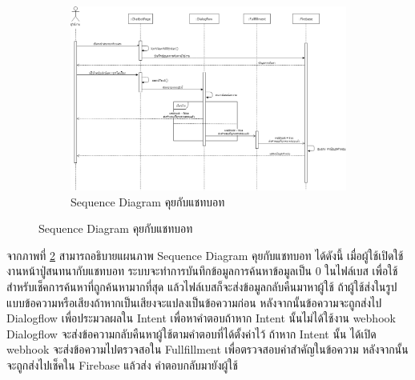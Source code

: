 	\begin{figure}
	\begin{figure}[H]
		\centering
		\includegraphics[width=0.8\columnwidth]
		{Figures/3/Sequence/chatbot}
		\caption{Sequence Diagram คุยกับแชทบอท}
		\label{Fig:Sequence-chatbot}
	\end{figure}
\end{figure}
	\newpage
	จากภาพที่ \ref{Fig:Sequence-chatbot} สามารถอธิบายแผนภาพ Sequence Diagram คุยกับแชทบอท ได้ดังนี้ 
	เมื่อผู้ใช้เปิดใช้งานหน้าปู่สนทนากับแชทบอท ระบบจะทำการบันทึกข้อมูลการค้นหาข้อมูลเป็น 0 ในไฟล์เบส เพื่อใช้สำหรับเช็คการค้นหาที่ถูกค้นหามากที่สุด
	แล้วไฟล์เบสก็จะส่งข้อมูลกลับคืนมาหาผู้ใช้ ถ้าผู้ใช้ส่งในรูปแบบข้อความหรือเสียงถ้าหากเป็นเสียงจะแปลงเป็นข้อความก่อน หลังจากนั้นข้อความจะถูกส่งไป Dialogflow 
	เพื่อประมวลผลใน Intent เพื่อหาคำตอบถ้าหาก Intent นั้นไม่ได้ใช้งาน webhook Dialogflow จะส่งข้อความกลับคืนหาผู้ใช้ตามคำตอบที่ได้ตั้งค่าไว้ ถ้าหาก Intent นั้น
	ได้เปิด webhook จะส่งข้อความไปตรวจสอใน Fullfillment เพื่อตรวจสอบคำสำคัญในข้อความ หลังจากนั้นจะถูกส่งไปเช็คใน Firebase แล้วส่ง
	คำตอบกลับมายังผู้ใช้
	\newpage	

